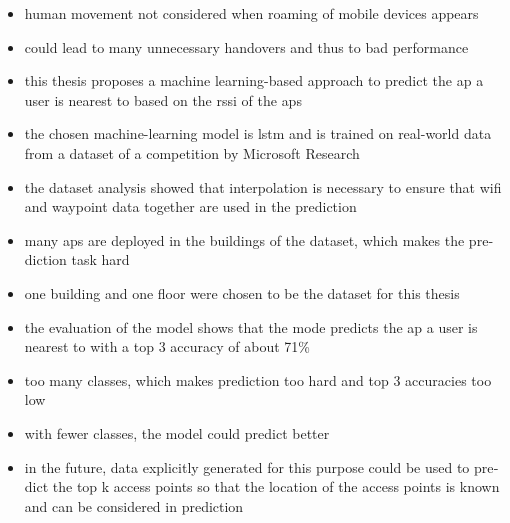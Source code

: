 \null\vfil
\begin{otherlanguage}{english}
\begin{center}\textsf{\textbf{\abstractname}}\end{center}

\noindent 
\begin{itemize}
    \item human movement not considered when roaming of mobile devices appears
    \item could lead to many unnecessary handovers and thus to bad performance
    \item this thesis proposes a machine learning-based approach to predict the \ac{ap} a user is nearest to based on the \ac{rssi} of the \acp{ap} 
    \item the chosen machine-learning model is \ac{lstm} and is trained on real-world data from a dataset of a competition by Microsoft Research 
    \item the dataset analysis showed that interpolation is necessary to ensure that \ac{wifi} and waypoint data together are used in the prediction
    \item many \acp{ap} are deployed in the buildings of the dataset, which makes the prediction task hard
    \item one building and one floor were chosen to be the dataset for this thesis
    \item the evaluation of the model shows that the mode predicts the \ac{ap} a user is nearest to with a top 3 accuracy of about 71\%
    \item too many classes, which makes prediction too hard and top 3 accuracies too low
    \item with fewer classes, the model could predict better
    \item in the future, data explicitly generated for this purpose could be used to predict the top k access points so that the location of the access points is known and can be considered in prediction
\end{itemize}

\end{otherlanguage}
\vfil\null

